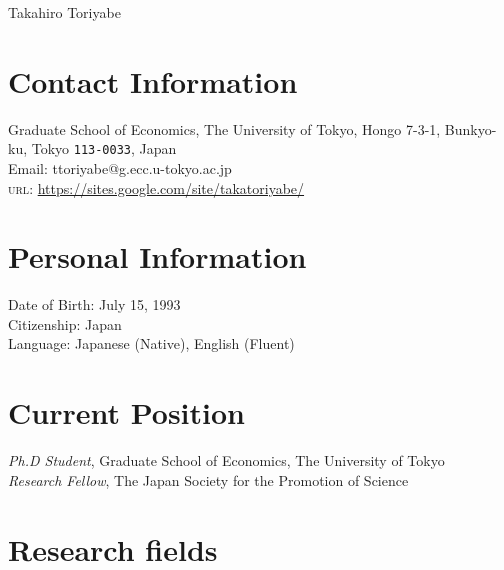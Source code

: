 \documentclass[11pt, a4paper]{article} %
\begin{document}

{\LARGE Takahiro Toriyabe}\\[1cm] %

\section*{Contact Information}
Graduate School of Economics, The University of Tokyo, Hongo 7-3-1, Bunkyo-ku, Tokyo \texttt{113-0033}, Japan\\
Email: ttoriyabe@g.ecc.u-tokyo.ac.jp\\ %
\textsc{url}: \url{https://sites.google.com/site/takatoriyabe/}\\ %



\section*{Personal Information}

Date of Birth: July 15, 1993\\ %
Citizenship: Japan\\ %
Language: Japanese (Native), English (Fluent)


\section*{Current Position}

\emph{Ph.D Student}, Graduate School of Economics, The University of Tokyo\\
\emph{Research Fellow}, The Japan Society for the Promotion of Science


\section*{Research fields}
\end{document}
